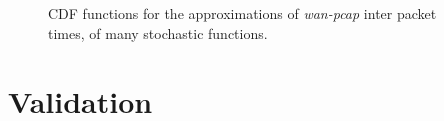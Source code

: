 \begin{figure}[ht!]
{	}
	\hspace{0mm}
	\caption{CDF functions for the approximations of \textit{wan-pcap} inter  packet times, of many stochastic functions.}
\end{figure}


\section{Validation}




